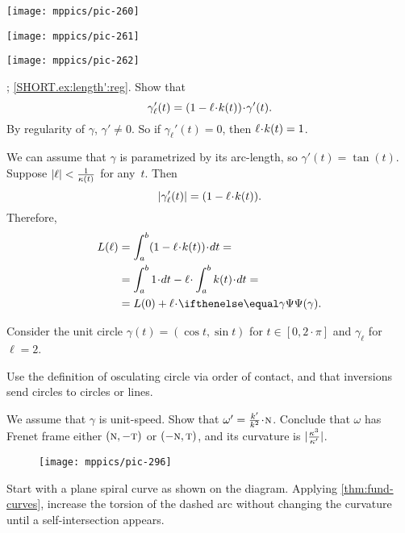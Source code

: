 \begin{multicols}{2}
\begin{Figure}
\begin{minipage}{.27\textwidth}
\centering
\texttt{[image: mppics/pic-260]}
\end{minipage}\hfill
\begin{minipage}{.42\textwidth}
\centering
\texttt{[image: mppics/pic-261]}
\end{minipage}
\hfill
\begin{minipage}{.27\textwidth}
\centering
\texttt{[image: mppics/pic-262]}
\end{minipage}
\end{Figure}

\parbf{\ref{ex:length'}}; \ref{SHORT.ex:length':reg}.
Show that
\[
\gamma_\ell'(t)=(1-\ell\cdot\skur(t))\cdot \gamma'(t).
\]
By regularity of $\gamma$, $\gamma'\ne0$.
So if $\gamma_\ell'(t)=0$, then $\ell\cdot \skur(t)= 1$.

 We can assume that $\gamma$ is parametrized by its arc-length, so $\gamma'(t)=\tan(t)$.
Suppose $|\ell|<\frac{1}{\kappa(t)}$ for any~$t$.
Then 
\[
|\gamma_\ell'(t)|=(1-\ell\cdot\skur(t)).
\]
Therefore,
\begin{align*}
L(\ell)
&=
\int_a^b(1-\ell\cdot\skur(t))\cdot dt=
\\&=
\int_a^b 1\cdot dt-\ell\cdot \int_a^b\skur(t)\cdot dt=
\\
&=
L(0)+\ell\cdot\tgc\gamma.
\end{align*}



Consider the unit circle $\gamma(t)=(\cos t,\sin t)$ for $t\in[0,2\cdot\pi]$ and $\gamma_\ell$ for $\ell=2$.

Use the definition of osculating circle via order of contact, and that inversions send circles to circles or lines. 

We assume that $\gamma$ is unit-speed.
Show that $\omega'=\tfrac{\skur'}{\skur^2}\cdot \norm$. 
Conclude that $\omega$ has Frenet frame either $(\text{\sc{n}},-\text{\sc{t}})$ or $(-\text{\sc{n}},\text{\sc{t}})$, and its curvature is $|\tfrac{\kappa^3}{\kappa'}|$.

\begin{wrapfigure}{r}{19 mm}
\vskip-4mm
\centering
\texttt{[image: mppics/pic-296]}
\vskip-0mm
\end{wrapfigure}

Start with a plane spiral curve as shown on the diagram.
Applying \ref{thm:fund-curves}, increase the torsion of the dashed arc without changing the curvature until a self-intersection appears.


\end{multicols}

